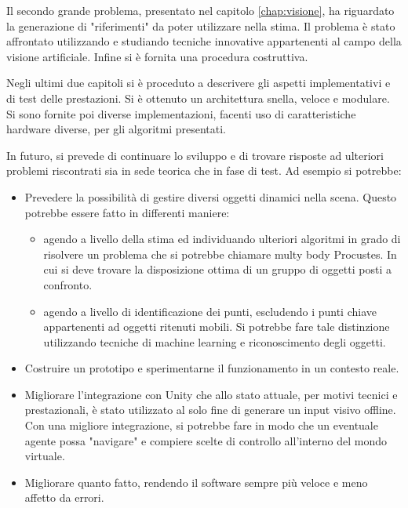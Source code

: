 Il secondo grande problema, presentato nel capitolo \ref{chap:visione}, ha riguardato la generazione di "riferimenti" da poter utilizzare nella stima. Il problema è stato affrontato utilizzando e studiando tecniche innovative appartenenti al campo della visione artificiale. Infine si è fornita una procedura costruttiva.

Negli ultimi due capitoli si è proceduto a descrivere gli aspetti implementativi e di test delle prestazioni. Si è ottenuto un architettura snella, veloce e modulare. Si sono fornite poi diverse implementazioni, facenti uso di caratteristiche hardware diverse, per gli algoritmi presentati.

In futuro, si prevede di continuare lo sviluppo e di trovare risposte ad ulteriori problemi riscontrati sia in sede teorica che in fase di test. Ad esempio si potrebbe:
\begin{itemize}
	\item Prevedere la possibilità di gestire diversi oggetti dinamici nella scena. Questo potrebbe essere fatto in differenti maniere:
	\begin{itemize}
		\item agendo a livello della stima ed individuando ulteriori algoritmi in grado di risolvere un problema che si potrebbe chiamare multy body Procustes. In cui si deve trovare la disposizione ottima di un gruppo di oggetti posti a confronto.
		\item agendo a livello di identificazione dei punti, escludendo i punti chiave appartenenti ad oggetti ritenuti mobili. Si potrebbe fare tale distinzione utilizzando tecniche di machine learning e riconoscimento degli oggetti.
	\end{itemize}
	\item Costruire un prototipo e sperimentarne il funzionamento in un contesto reale.
	\item Migliorare l'integrazione con Unity che allo stato attuale, per motivi tecnici e prestazionali, è stato utilizzato al solo fine di generare un input visivo offline. Con una migliore integrazione, si potrebbe fare in modo che un eventuale agente possa "navigare" e compiere scelte di controllo all'interno del mondo virtuale.
	\item Migliorare quanto fatto, rendendo il software sempre più veloce e meno affetto da errori.
\end{itemize}